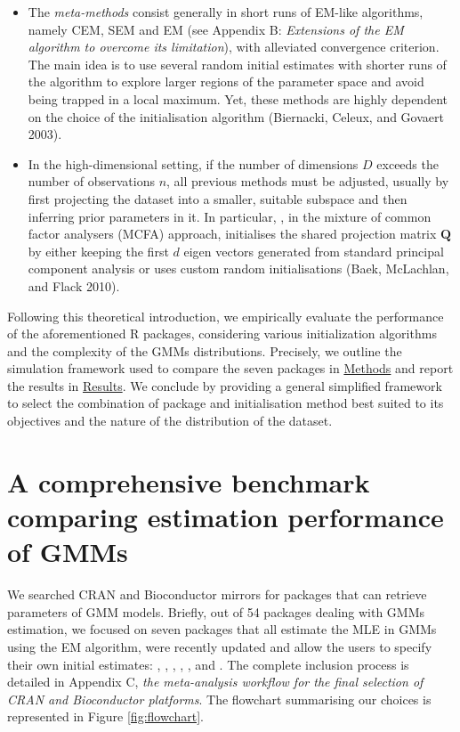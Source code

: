 \begin{itemize}
\item
  The \emph{meta-methods} consist generally in short runs of EM-like
  algorithms, namely CEM, SEM and EM (see Appendix B: \emph{Extensions of the EM algorithm to overcome its limitation}), with alleviated convergence criterion. The main idea is
  to use several random initial estimates with shorter runs of the
  algorithm to explore larger regions of the parameter space and avoid being trapped in a local maximum. Yet, these methods are highly dependent on the choice of the initialisation algorithm (Biernacki, Celeux, and Govaert 2003).
\item
  In the high-dimensional setting, if the number of dimensions \(D\) exceeds the number of observations \(n\), all previous methods must be adjusted, usually by first projecting the dataset into a smaller, suitable subspace and then inferring prior parameters in it. In particular, , in the mixture of common factor analysers (MCFA) approach, initialises the shared projection matrix \(\boldsymbol{Q}\) by either keeping the first \(d\) eigen vectors generated from standard principal component analysis or uses custom random initialisations (Baek, McLachlan, and Flack 2010).
\end{itemize}

Following this theoretical introduction, we empirically evaluate the performance of the aforementioned R packages, considering various initialization algorithms and the complexity of the GMMs distributions.
Precisely, we outline the simulation framework used to compare the seven packages in \protect\hyperlink{methods}{Methods} and report the results in \protect\hyperlink{results}{Results}. We conclude by providing a general simplified framework to select the combination of package and initialisation method best suited to its objectives and the nature of the distribution of the dataset.

\hypertarget{a-comprehensive-benchmark-comparing-estimation-performance-of-gmms}{%
\section{A comprehensive benchmark comparing estimation performance of GMMs}\label{a-comprehensive-benchmark-comparing-estimation-performance-of-gmms}}

We searched CRAN and Bioconductor mirrors for packages that can retrieve
parameters of GMM models. Briefly, out of 54 packages dealing with GMMs
estimation, we focused on seven packages that all estimate the
MLE in GMMs using the EM algorithm, were recently
updated and allow the users to specify their own initial estimates:
, , ,
, ,  and . The
complete inclusion process is detailed in Appendix C, \emph{the meta-analysis workflow for the final selection of CRAN and Bioconductor platforms}. The flowchart summarising our choices is represented in Figure \ref{fig:flowchart}.

